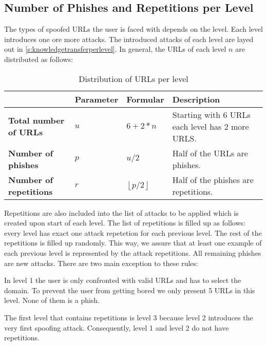 \subsection{Number of Phishes and Repetitions per Level}
The types of spoofed URLs the user is faced with depends on the level.
Each level introduces one ore more attacks.
The introduced attacks of each level are layed out in \autoref{s:knowledgetransferperlevel}.
In general, the URLs of each level $n$ are distributed as follows:
\begin{table}[hHtbp]
\centering
\begin{tabular}{|llll|}
\hline
&\textbf{Parameter}&\textbf{Formular}&\textbf{Description}\\ \hline
\textbf{Total number of URLs}&$u$&$6+2*n$&Starting with 6 URLs each level has 2 more URLS.\\
\textbf{Number of phishes}&$p$&$u/2$&Half of the URLs are phishes.\\
\textbf{Number of repetitions}&$r$&$\left\lfloor p/2 \right\rfloor$&Half of the phishes are repetitions.\\
\hline
\end{tabular}
\caption{Distribution of URLs per level}
\label{t:levelurls}
\end{table}
Repetitions are also included into the list of attacks to be applied which is created upon start of each level.
The list of repetitions is filled up as follows: every level has exact one attack repetetion for each previous level. The rest of the repetitions is filled up randomly. This way, we assure that at least one example of each previous level is represented by the attack repetitions. All remaining phishes are new attacks.
There are two main exception to these rules:
\begin{description}[leftmargin=0cm]
\item[Level 1:] In level 1 the user is only confronted with valid URLs and has to select the domain.
To prevent the user from getting bored we only present 5 URLs in this level.
None of them is a phish.
\item[Level 1+2:] The first level that contains repetitions is level 3 because level 2 introduces the very first spoofing attack. Consequently, level 1 and level 2 do not have repetitions.
\end{description}


